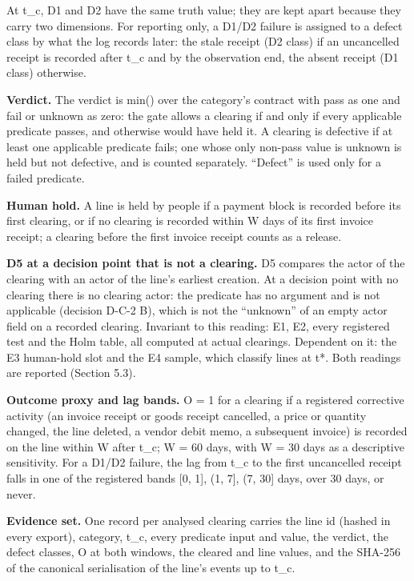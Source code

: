 \documentclass[
  10pt,
]{article}
\begin{document}
At t\_c, D1 and D2 have the same truth value; they are kept apart
because they carry two dimensions. For reporting only, a D1/D2 failure
is assigned to a defect class by what the log records later: the stale
receipt (D2 class) if an uncancelled receipt is recorded after t\_c and
by the observation end, the absent receipt (D1 class) otherwise.

\textbf{Verdict.} The verdict is min() over the category's contract with
pass as one and fail or unknown as zero: the gate allows a clearing if
and only if every applicable predicate passes, and otherwise would have
held it. A clearing is defective if at least one applicable predicate
fails; one whose only non-pass value is unknown is held but not
defective, and is counted separately. ``Defect'' is used only for a
failed predicate.

\textbf{Human hold.} A line is held by people if a payment block is
recorded before its first clearing, or if no clearing is recorded within
W days of its first invoice receipt; a clearing before the first invoice
receipt counts as a release.

\textbf{D5 at a decision point that is not a clearing.} D5 compares the
actor of the clearing with an actor of the line's earliest creation. At
a decision point with no clearing there is no clearing actor: the
predicate has no argument and is not applicable (decision D-C-2 B),
which is not the ``unknown'' of an empty actor field on a recorded
clearing. Invariant to this reading: E1, E2, every registered test and
the Holm table, all computed at actual clearings. Dependent on it: the
E3 human-hold slot and the E4 sample, which classify lines at t*. Both
readings are reported (Section 5.3).

\textbf{Outcome proxy and lag bands.} O = 1 for a clearing if a
registered corrective activity (an invoice receipt or goods receipt
cancelled, a price or quantity changed, the line deleted, a vendor debit
memo, a subsequent invoice) is recorded on the line within W after t\_c;
W = 60 days, with W = 30 days as a descriptive sensitivity. For a D1/D2
failure, the lag from t\_c to the first uncancelled receipt falls in one
of the registered bands {[}0, 1{]}, (1, 7{]}, (7, 30{]} days, over 30
days, or never.

\textbf{Evidence set.} One record per analysed clearing carries the line
id (hashed in every export), category, t\_c, every predicate input and
value, the verdict, the defect classes, O at both windows, the cleared
and line values, and the SHA-256 of the canonical serialisation of the
line's events up to t\_c.
\end{document}
